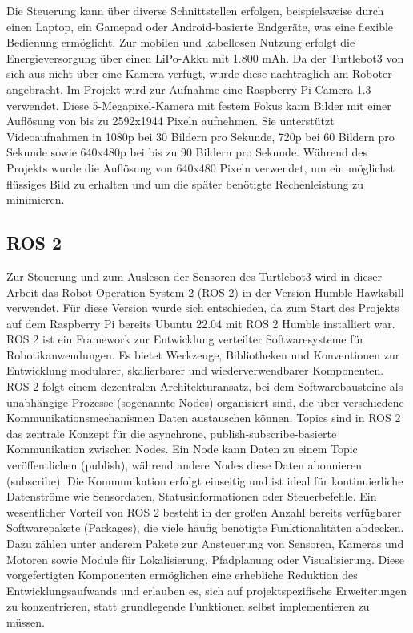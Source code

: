 Die Steuerung kann über diverse Schnittstellen erfolgen, beispielsweise durch einen Laptop, ein Gamepad oder Android-basierte Endgeräte, was eine flexible Bedienung ermöglicht.
Zur mobilen und kabellosen Nutzung erfolgt die Energieversorgung über einen LiPo-Akku mit 1.800 mAh.
\cite{tb3_home}\cite{tb3_specifications}
\newPar
Da der Turtlebot3 von sich aus nicht über eine Kamera verfügt, wurde diese nachträglich am Roboter angebracht. 
Im Projekt wird zur Aufnahme eine Raspberry Pi Camera 1.3 verwendet.
Diese 5-Megapixel-Kamera mit festem Fokus kann Bilder mit einer Auflösung von bis zu 2592x1944 Pixeln aufnehmen. 
Sie unterstützt Videoaufnahmen in 1080p bei 30 Bildern pro Sekunde, 720p bei 60 Bildern pro Sekunde sowie 640x480p bei bis zu 90 Bildern pro Sekunde.
Während des Projekts wurde die Auflösung von 640x480 Pixeln verwendet, um ein möglichst flüssiges Bild zu erhalten und um die später benötigte Rechenleistung zu minimieren.
\cite{pi_camera}
\subsection{ROS 2}
Zur Steuerung und zum Auslesen der Sensoren des Turtlebot3 wird in dieser Arbeit das Robot Operation System 2 (ROS 2) in der Version Humble Hawksbill verwendet. 
Für diese Version wurde sich entschieden, da zum Start des Projekts auf dem Raspberry Pi bereits Ubuntu 22.04 mit ROS 2 Humble installiert war.
\newPar
ROS 2 ist ein Framework zur Entwicklung verteilter Softwaresysteme für Robotikanwendungen. 
Es bietet Werkzeuge, Bibliotheken und Konventionen zur Entwicklung modularer, skalierbarer und wiederverwendbarer Komponenten. 
ROS 2 folgt einem dezentralen Architekturansatz, bei dem Softwarebausteine als unabhängige Prozesse (sogenannte Nodes) organisiert sind, die über verschiedene Kommunikationsmechanismen Daten austauschen können.
Topics sind in ROS 2 das zentrale Konzept für die asynchrone, publish-subscribe-basierte Kommunikation zwischen Nodes. 
Ein Node kann Daten zu einem Topic veröffentlichen (publish), während andere Nodes diese Daten abonnieren (subscribe). 
Die Kommunikation erfolgt einseitig und ist ideal für kontinuierliche Datenströme wie Sensordaten, Statusinformationen oder Steuerbefehle.
\cite{ros2_documentation}\cite{ros2_nodes}\cite{ros2_topics}
\newPar
Ein wesentlicher Vorteil von ROS 2 besteht in der großen Anzahl bereits verfügbarer Softwarepakete (Packages), die viele häufig benötigte Funktionalitäten abdecken. 
Dazu zählen unter anderem Pakete zur Ansteuerung von Sensoren, Kameras und Motoren sowie Module für Lokalisierung, Pfadplanung oder Visualisierung. 
Diese vorgefertigten Komponenten ermöglichen eine erhebliche Reduktion des Entwicklungsaufwands und erlauben es, sich auf projektspezifische Erweiterungen zu konzentrieren, statt grundlegende Funktionen selbst implementieren zu müssen.
